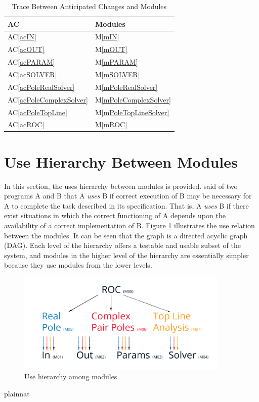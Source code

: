 \documentclass[12pt, titlepage]{article}
\newcommand{\acref}[1]{AC\ref{#1}}
\newcommand{\mref}[1]{M\ref{#1}}
\begin{document}
\begin{table}[H]
\centering
\begin{tabular}{p{} p{}}
\toprule
\textbf{AC} & \textbf{Modules}\\
\midrule
  \acref{acIN} & \mref{mIN}\\
  \acref{acOUT} & \mref{mOUT}\\
  \acref{acPARAM} & \mref{mPARAM}\\
  \acref{acSOLVER} & \mref{mSOLVER}\\
  \acref{acPoleRealSolver} & \mref{mPoleRealSolver}\\
  \acref{acPoleComplexSolver} & \mref{mPoleComplexSolver}\\
  \acref{acPoleTopLine} & \mref{mPoleTopLineSolver}\\
  \acref{acROC} & \mref{mROC}\\
\bottomrule
\end{tabular}
\caption{Trace Between Anticipated Changes and Modules}
\label{TblACT}
\end{table}

\section{Use Hierarchy Between Modules} \label{SecUse}

In this section, the uses hierarchy between modules is
provided. \citet{Parnas1978} said of two programs A and B that A {\em uses} B if
correct execution of B may be necessary for A to complete the task described in
its specification. That is, A {\em uses} B if there exist situations in which
the correct functioning of A depends upon the availability of a correct
implementation of B.  Figure \ref{FigUH} illustrates the use relation between
the modules. It can be seen that the graph is a directed acyclic graph
(DAG). Each level of the hierarchy offers a testable and usable subset of the
system, and modules in the higher level of the hierarchy are essentially simpler
because they use modules from the lower levels.

\begin{figure}[H]
\centering
\includegraphics[width=0.9\textwidth]{roc-uses-diagram.jpg}
\caption{Use hierarchy among modules}
\label{FigUH}
\end{figure}


 {plainnat}

\end{document}
